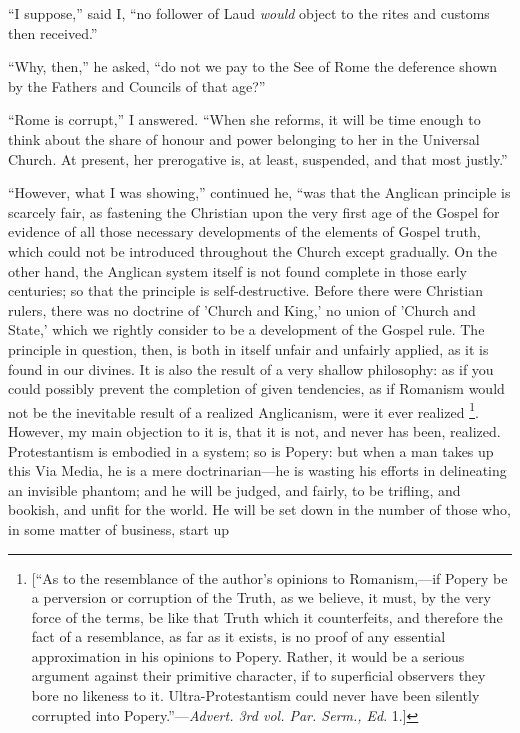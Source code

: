 ``I suppose,'' said I, ``no follower of Laud \emph{would}
object to the rites and customs then received.''

``Why, then,'' he asked, ``do not we pay to the See
of Rome the deference shown by the Fathers and Councils of that
age?''

``Rome is corrupt,'' I answered. ``When she reforms,
it will be time enough to think about the share of honour and power
belonging to her in the Universal Church. At present, her prerogative
is, at least, suspended, and that most justly.''

``However, what I was showing,'' continued he, ``was
that the Anglican principle is scarcely fair, as fastening the
Christian upon the very first age of the Gospel for evidence of
all those necessary developments of the elements of Gospel truth,
which could not be introduced throughout the Church except gradually.
On the other hand, the Anglican system itself is not found complete in
those early centuries; so that the principle is self-destructive.
Before there were Christian rulers, there was no doctrine of 'Church
and King,' no union of 'Church and State,' which we rightly consider
to be a development of the Gospel rule. The principle in question,
then, is both in itself unfair and unfairly applied, as it is found in
our divines. It is also the result of a very shallow philosophy: as if
you could possibly prevent the completion of given tendencies, as if
Romanism would not be the inevitable result of a realized Anglicanism,
were it ever realized \footnote{[``As to the resemblance of the author's
opinions to Romanism,—if Popery be a perversion or corruption of the
Truth, as we believe, it must, by the very force of the terms, be like
that Truth which it counterfeits, and therefore the fact of a
resemblance, as far as it exists, is no proof of any essential
approximation in his opinions to Popery. Rather, it would be a serious
argument against their primitive character, if to superficial
observers they bore no likeness to it. Ultra-Protestantism could never
have been silently corrupted into Popery.''—\emph{Advert. 3rd vol. Par.
Serm., Ed}. 1.]}. However, my main objection to it is,
that it is not, and never has been, realized. Protestantism is
embodied in a system; so is Popery: but when a man takes up this Via
Media, he is a mere doctrinarian—he is wasting his efforts in
delineating an invisible phantom; and he will be judged, and fairly,
to be trifling, and bookish, and unfit for the world. He will be set
down in the number of those who, in some matter of business, start up
